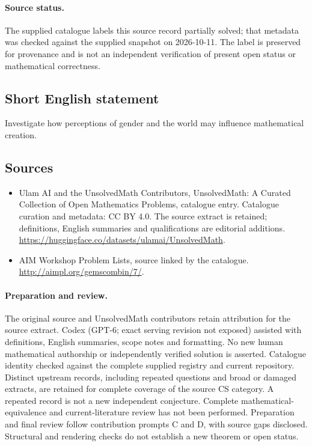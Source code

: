 \documentclass[11pt]{article}
\begin{document}
\paragraph{Source status.}
The supplied catalogue labels this source record partially solved; that metadata was checked against the supplied snapshot on 2026-10-11. The label is preserved for provenance and is not an independent verification of present open status or mathematical correctness.
\subsection{Short English statement}
Investigate how perceptions of gender and the world may influence mathematical creation.
\subsection{Sources}
\begin{itemize}
\item[\hypertarget{source:statement:1}{S1}] Ulam AI and the UnsolvedMath Contributors, UnsolvedMath: A Curated Collection of Open Mathematics Problems, catalogue entry. Catalogue curation and metadata: CC BY 4.0. The source extract is retained; definitions, English summaries and qualifications are editorial additions.
\url{https://huggingface.co/datasets/ulamai/UnsolvedMath}.
\item[\hypertarget{source:statement:2}{S2}] AIM Workshop Problem Lists, source linked by the catalogue.
\url{http://aimpl.org/gemscombin/7/}.
\end{itemize}
\paragraph{Preparation and review.}
The original source and UnsolvedMath contributors retain attribution for the source extract. Codex (GPT-6; exact serving revision not exposed) assisted with definitions, English summaries, scope notes and formatting. No new human mathematical authorship or independently verified solution is asserted. Catalogue identity checked against the complete supplied registry and current repository. Distinct upstream records, including repeated questions and broad or damaged extracts, are retained for complete coverage of the source CS category. A repeated record is not a new independent conjecture. Complete mathematical-equivalence and current-literature review has not been performed. Preparation and final review follow contribution prompts C and D, with source gaps disclosed. Structural and rendering checks do not establish a new theorem or open status.
\label{end:statement}
\end{document}
